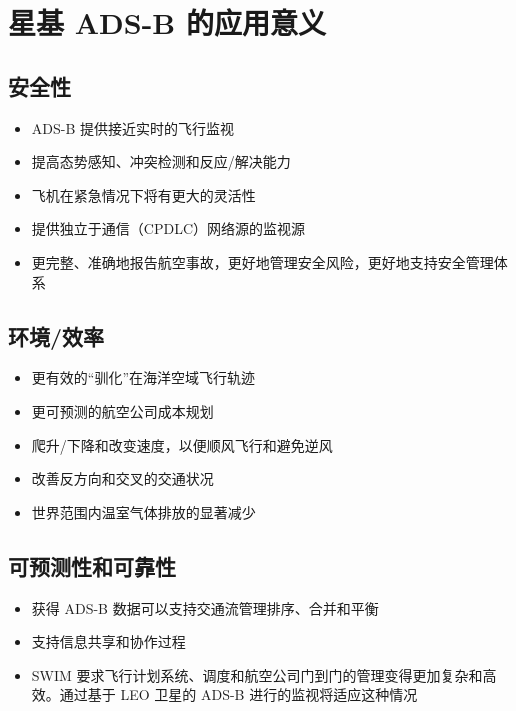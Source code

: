 
\section{星基 ADS-B 的应用意义}

\subsection{安全性}

\begin{itemize}
\item ADS-B 提供接近实时的飞行监视

\item 提高态势感知、冲突检测和反应/解决能力

\item 飞机在紧急情况下将有更大的灵活性

\item 提供独立于通信（CPDLC）网络源的监视源

\item 更完整、准确地报告航空事故，更好地管理安全风险，更好地支持安全管理体系
\end{itemize}

\subsection{环境/效率}

\begin{itemize}
\item 更有效的“驯化”在海洋空域飞行轨迹

\item 更可预测的航空公司成本规划

\item 爬升/下降和改变速度，以便顺风飞行和避免逆风

\item 改善反方向和交叉的交通状况

\item 世界范围内温室气体排放的显著减少
\end{itemize}


\subsection{可预测性和可靠性}

\begin{itemize}
\item 获得 ADS-B 数据可以支持交通流管理排序、合并和平衡

\item 支持信息共享和协作过程

\item SWIM 要求飞行计划系统、调度和航空公司门到门的管理变得更加复杂和高效。通过基于 LEO 卫星的 ADS-B 进行的监视将适应这种情况
\end{itemize}

